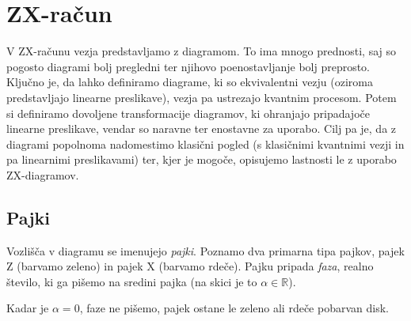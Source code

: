 \documentclass[mat1]{fmfdelo}
\newcommand{\R}{\mathbb R}
\begin{document}

\section{ZX-račun}
V ZX-računu vezja predstavljamo z diagramom. To ima mnogo prednosti, saj so pogosto diagrami bolj pregledni ter njihovo poenostavljanje bolj preprosto. Ključno je, da lahko definiramo diagrame, ki so ekvivalentni vezju (oziroma predstavljajo linearne preslikave), vezja pa ustrezajo kvantnim procesom. Potem si definiramo dovoljene transformacije diagramov, ki ohranjajo pripadajoče linearne preslikave, vendar so naravne ter enostavne za uporabo. Cilj pa je, da z diagrami popolnoma nadomestimo klasični pogled (s klasičnimi kvantnimi vezji in pa linearnimi preslikavami) ter, kjer je mogoče, opisujemo lastnosti le z uporabo ZX-diagramov.
\subsection{Pajki}
Vozlišča v diagramu se imenujejo \emph{pajki}. Poznamo dva primarna tipa pajkov, pajek Z (barvamo zeleno) in pajek X (barvamo rdeče). Pajku pripada \emph{faza}, realno število, ki ga pišemo na sredini pajka (na skici je to \(\alpha\in\R\)).
\begin{center}
\end{center}
Kadar je \(\alpha = 0\), faze ne pišemo, pajek ostane le zeleno ali rdeče pobarvan disk.
\end{document}
